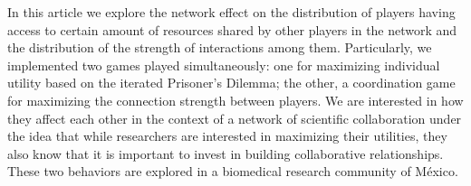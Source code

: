 \documentclass[11pt]{article}
\begin{document}






 In this article we explore the network effect on the distribution
   of players having access to certain amount of resources shared by other players in the
   network and the distribution of the strength of interactions among
   them. Particularly, we implemented two games played simultaneously: 
   one for maximizing individual utility based on the iterated Prisoner's
   Dilemma; the other, a coordination game for maximizing the connection strength between
   players. We are interested in how they affect each other in 
   the context of a network of scientific collaboration under the idea that while
   researchers are interested in maximizing their utilities, they also know that
   it is important to invest in building collaborative relationships. These two
   behaviors are explored in a biomedical research community of M\'exico.\\
\end{document}
